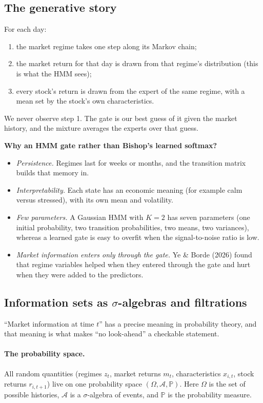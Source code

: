 \subsection{The generative story}
For each day:
\begin{enumerate}
  \item the market regime takes one step along its Markov chain;
  \item the market return for that day is drawn from that regime's distribution (this is what the HMM sees);
  \item every stock's return is drawn from the expert of the same regime, with a mean set by the stock's own characteristics.
\end{enumerate}
We never observe step 1. The gate is our best guess of it given the market history, and the mixture averages the experts over that guess.

\textbf{Why an HMM gate rather than Bishop's learned softmax?}
\begin{itemize}
  \item \emph{Persistence.} Regimes last for weeks or months, and the transition matrix builds that memory in.
  \item \emph{Interpretability.} Each state has an economic meaning (for example calm versus stressed), with its own mean and volatility.
  \item \emph{Few parameters.} A Gaussian HMM with $K=2$ has seven parameters (one initial probability, two transition probabilities, two means, two variances), whereas a learned gate is easy to overfit when the signal-to-noise ratio is low.
  \item \emph{Market information enters only through the gate.} Ye \& Borde (2026) found that regime variables helped when they entered through the gate and hurt when they were added to the predictors.
\end{itemize}

\subsection{Information sets as $\sigma$-algebras and filtrations}

``Market information at time $t$'' has a precise meaning in probability theory, and that meaning is what makes ``no look-ahead'' a checkable statement.

\paragraph{The probability space.} All random quantities (regimes $z_t$, market returns $m_t$, characteristics $x_{i,t}$, stock returns $r_{i,t+1}$) live on one probability space $(\Omega,\mathcal A,\mathbb P)$. Here $\Omega$ is the set of possible histories, $\mathcal A$ is a $\sigma$-algebra of events, and $\mathbb P$ is the probability measure.

